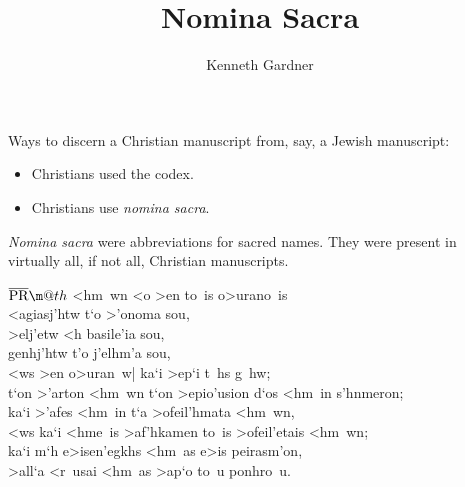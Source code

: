 \documentclass[aspectratio=169]{beamer}
\title{Nomina Sacra}
\author{Kenneth Gardner}
\begin{document}
\newcommand{\lord}{L{\scriptsize ORD}}
\newcommand{\yhwh}{Y{\scriptsize HWH}}

\makeatletter
\newcommand*{\textoverline}[1]{$\overline{\hbox{#1}}\m@th$}
\makeatother

\maketitle

\begin{frame}
  Ways to discern a Christian manuscript from, say, a Jewish manuscript:\pause
  \begin{itemize}
	\item Christians used the codex.\pause
	\item Christians use \emph{nomina sacra}.
  \end{itemize}
\end{frame}

\begin{frame}
  \emph{Nomina sacra} were abbreviations for sacred names.
  They were present in virtually all, if not all, Christian manuscripts.
\end{frame}

\begin{frame}
  \textoverline{PR} <hm~wn <o >en to~is o>urano~is\\
  <agiasj'htw t`o >'onoma sou,\\
  >elj'etw <h basile'ia sou,\\
  genhj'htw t'o j'elhm'a sou,\\
  <ws >en o>uran~w| ka`i >ep`i t~hs g~hw;\\
  t`on >'arton <hm~wn t`on >epio'usion d`os <hm~in s'hnmeron;\\
  ka`i >'afes <hm~in t`a >ofeil'hmata <hm~wn,\\
  <ws ka`i <hme~is >af'hkamen to~is >ofeil'etais <hm~wn;\\
  ka`i m`h e>isen'egkhs <hm~as e>is peirasm'on,\\
  >all`a <r~usai <hm~as >ap`o to~u ponhro~u.
\end{frame}
\end{document}
